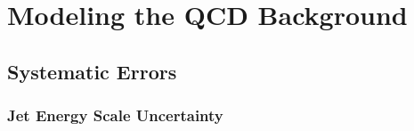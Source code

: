 \documentclass[dissertation.tex]{subfiles}
\begin{document}
\section{Modeling the QCD Background}
\label{sec:Modeling the QCD Background}







\subsection{Systematic Errors}

\subsubsection{Jet Energy Scale Uncertainty}
\end{document}
